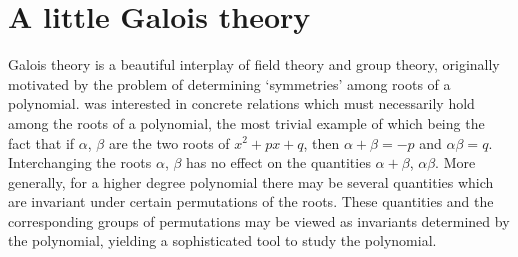 \section{A little Galois theory}
\label{sec:fields:a-little-galois-theory}

Galois theory is a beautiful interplay of field theory and group
theory, originally motivated by the problem of determining
`symmetries' among roots of a polynomial.  was interested
in concrete relations which must necessarily hold among the roots of a
polynomial, the most trivial example of which being the fact that if
$\alpha$, $\beta$ are the two roots of $x^2 + px + q$, then
$\alpha + \beta = -p$ and $\alpha\beta = q$.  Interchanging the roots
$\alpha$, $\beta$ has no effect on the quantities $\alpha + \beta$,
$\alpha\beta$. More generally, for a higher degree polynomial there
may be several quantities which are invariant under certain
permutations of the roots. These quantities and the corresponding
groups of permutations may be viewed as invariants determined by the
polynomial, yielding a sophisticated tool to study the polynomial.

